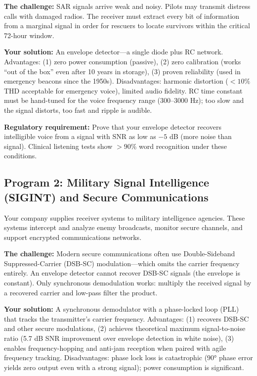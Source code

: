 \documentclass[11pt,letterpaper]{article}
\begin{document}
\textbf{The challenge:} SAR signals arrive weak and noisy. Pilots may transmit distress calls with damaged radios. The receiver must extract every bit of information from a marginal signal in order for rescuers to locate survivors within the critical 72-hour window.

\textbf{Your solution:} An envelope detector—a single diode plus RC network. Advantages: (1) zero power consumption (passive), (2) zero calibration (works ``out of the box'' even after 10 years in storage), (3) proven reliability (used in emergency beacons since the 1950s). Disadvantages: harmonic distortion ($< 10\%$ THD acceptable for emergency voice), limited audio fidelity. RC time constant must be hand-tuned for the voice frequency range (300--3000 Hz); too slow and the signal distorts, too fast and ripple is audible.

\textbf{Regulatory requirement:} Prove that your envelope detector recovers intelligible voice from a signal with SNR as low as $-5$ dB (more noise than signal). Clinical listening tests show $> 90\%$ word recognition under these conditions.

\subsection{Program 2: Military Signal Intelligence (SIGINT) and Secure Communications}

Your company supplies receiver systems to military intelligence agencies. These systems intercept and analyze enemy broadcasts, monitor secure channels, and support encrypted communications networks.

\textbf{The challenge:} Modern secure communications often use Double-Sideband Suppressed-Carrier (DSB-SC) modulation—which omits the carrier frequency entirely. An envelope detector cannot recover DSB-SC signals (the envelope is constant). Only synchronous demodulation works: multiply the received signal by a recovered carrier and low-pass filter the product.

\textbf{Your solution:} A synchronous demodulator with a phase-locked loop (PLL) that tracks the transmitter's carrier frequency. Advantages: (1) recovers DSB-SC and other secure modulations, (2) achieves theoretical maximum signal-to-noise ratio (5.7 dB SNR improvement over envelope detection in white noise), (3) enables frequency-hopping and anti-jam reception when paired with agile frequency tracking. Disadvantages: phase lock loss is catastrophic ($90°$ phase error yields zero output even with a strong signal); power consumption is significant.
\end{document}
